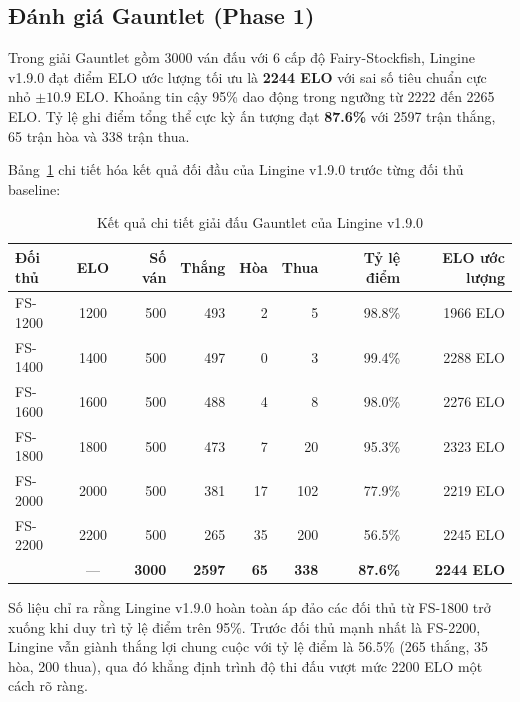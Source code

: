 \subsection{Đánh giá Gauntlet (Phase 1)}

Trong giải Gauntlet gồm 3000 ván đấu với 6 cấp độ Fairy-Stockfish, Lingine v1.9.0 đạt điểm ELO ước lượng tối ưu là \textbf{2244 ELO} với sai số tiêu chuẩn cực nhỏ $\pm 10.9$ ELO. Khoảng tin cậy 95\% dao động trong ngưỡng từ 2222 đến 2265 ELO. Tỷ lệ ghi điểm tổng thể cực kỳ ấn tượng đạt \textbf{87.6\%} với 2597 trận thắng, 65 trận hòa và 338 trận thua.

Bảng~\ref{tab:gauntlet_190} chi tiết hóa kết quả đối đầu của Lingine v1.9.0 trước từng đối thủ baseline:

\begin{table}[htbp]
    \centering
    \small
    \begin{tabular}{lcrrrrrr}
        \toprule
        \textbf{Đối thủ} & \textbf{ELO} & \textbf{Số ván} & \textbf{Thắng} & \textbf{Hòa} & \textbf{Thua} & \textbf{Tỷ lệ điểm} & \textbf{ELO ước lượng} \\
        \midrule
        FS-1200 & 1200 & 500 & 493 & 2 & 5 & 98.8\% & 1966 ELO \\
        FS-1400 & 1400 & 500 & 497 & 0 & 3 & 99.4\% & 2288 ELO \\
        FS-1600 & 1600 & 500 & 488 & 4 & 8 & 98.0\% & 2276 ELO \\
        FS-1800 & 1800 & 500 & 473 & 7 & 20 & 95.3\% & 2323 ELO \\
        FS-2000 & 2000 & 500 & 381 & 17 & 102 & 77.9\% & 2219 ELO \\
        FS-2200 & 2200 & 500 & 265 & 35 & 200 & 56.5\% & 2245 ELO \\
        \midrule
         & — & \textbf{3000} & \textbf{2597} & \textbf{65} & \textbf{338} & \textbf{87.6\%} & \textbf{2244 ELO} \\
        \bottomrule
    \end{tabular}
    \caption{Kết quả chi tiết giải đấu Gauntlet của Lingine v1.9.0}
    \label{tab:gauntlet_190}
\end{table}

Số liệu chỉ ra rằng Lingine v1.9.0 hoàn toàn áp đảo các đối thủ từ FS-1800 trở xuống khi duy trì tỷ lệ điểm trên 95\%. Trước đối thủ mạnh nhất là FS-2200, Lingine vẫn giành thắng lợi chung cuộc với tỷ lệ điểm là 56.5\% (265 thắng, 35 hòa, 200 thua), qua đó khẳng định trình độ thi đấu vượt mức 2200 ELO một cách rõ ràng.

